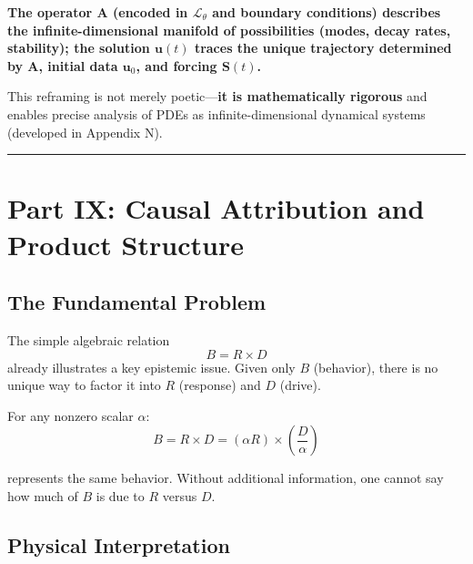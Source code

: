\documentclass[
]{article}
\begin{document}
\begin{tcolorbox}[enhanced jigsaw, left=2mm, bottomrule=.15mm, titlerule=0mm, rightrule=.15mm, leftrule=.75mm, colframe=quarto-callout-tip-color-frame, opacitybacktitle=0.6, colbacktitle=quarto-callout-tip-color!10!white, bottomtitle=1mm, breakable, coltitle=black, toptitle=1mm, arc=.35mm, colback=white, title=\textcolor{quarto-callout-tip-color}{\faLightbulb}\hspace{0.5em}{Division of Labor (Rigorous)}, opacityback=0, toprule=.15mm]

\textbf{The operator \(\mathbf{A}\) (encoded in \(\mathcal{L}_\theta\)
and boundary conditions) describes the infinite-dimensional manifold of
possibilities (modes, decay rates, stability); the solution
\(\mathbf{u}(t)\) traces the unique trajectory determined by
\(\mathbf{A}\), initial data \(\mathbf{u}_0\), and forcing
\(\mathbf{S}(t)\).}

\end{tcolorbox}

This reframing is not merely poetic---\textbf{it is mathematically
rigorous} and enables precise analysis of PDEs as infinite-dimensional
dynamical systems (developed in Appendix N).

\begin{center}\rule{0.5\linewidth}{0.5pt}\end{center}

\section{Part IX: Causal Attribution and Product
Structure}\label{part-ix-causal-attribution-and-product-structure}

\subsection{The Fundamental Problem}\label{the-fundamental-problem}

The simple algebraic relation \[B = R \times D\] already illustrates a
key epistemic issue. Given only \(B\) (behavior), there is no unique way
to factor it into \(R\) (response) and \(D\) (drive).

For any nonzero scalar \(\alpha\):
\[B = R \times D = (\alpha R) \times \left(\frac{D}{\alpha}\right)\]

represents the same behavior. Without additional information, one cannot
say how much of \(B\) is due to \(R\) versus \(D\).

\subsection{Physical Interpretation}\label{physical-interpretation}
\end{document}
